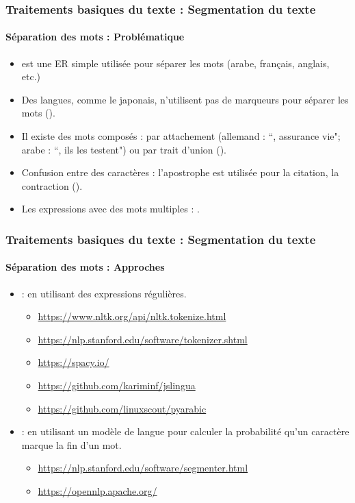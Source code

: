 \documentclass[xcolor=table]{beamer}
\begin{document}
\begin{frame}
\frametitle{Traitements basiques du texte : Segmentation du texte}
\framesubtitle{Séparation des mots : Problématique}


\begin{itemize}
	\item \expword{/[ ]+/} est une ER simple utilisée pour séparer les mots (arabe, français, anglais, etc.)
	\item Des langues, comme le japonais, n'utilisent pas de marqueurs pour séparer les mots ().
	\item Il existe des mots composés : par attachement (allemand : ``, assurance vie"; arabe : ``, ils les testent") ou par trait d'union ().
	\item Confusion entre des caractères : l'apostrophe est utilisée pour la citation, la contraction ().
	\item Les expressions avec des mots multiples : .
\end{itemize}

\end{frame}

\begin{frame}
\frametitle{Traitements basiques du texte : Segmentation du texte}
\framesubtitle{Séparation des mots : Approches}

\begin{itemize}
	\item {} : en utilisant des expressions régulières.
	\begin{itemize}
		\item \url{https://www.nltk.org/api/nltk.tokenize.html}
		\item \url{https://nlp.stanford.edu/software/tokenizer.shtml}
		\item \url{https://spacy.io/}
		\item \url{https://github.com/kariminf/jslingua}
		\item \url{https://github.com/linuxscout/pyarabic}
	\end{itemize}
	\item {} : en utilisant un modèle de langue pour calculer la probabilité qu'un caractère marque la  fin d'un mot.
	\begin{itemize}
		\item \url{https://nlp.stanford.edu/software/segmenter.html}
		\item \url{https://opennlp.apache.org/}
	\end{itemize}
\end{itemize}

\end{frame}
\end{document}
